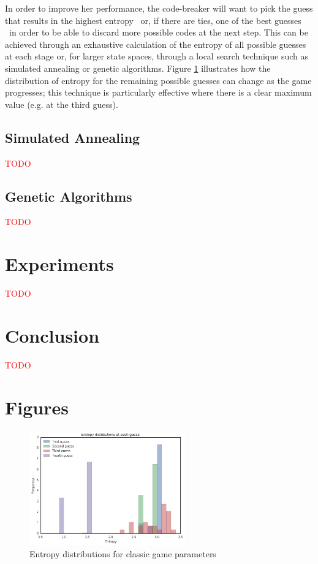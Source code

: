 \documentclass[11pt]{article}
\begin{document}
In order to improve her performance, the code-breaker will want to pick the guess that results in the highest entropy \textendash \ or, if there are ties, one of the best guesses \textendash \ in order to be able to discard more possible codes at the next step. This can be achieved through an exhaustive calculation of the entropy of all possible guesses at each stage or, for larger state spaces, through a local search technique such as simulated annealing or genetic algorithms.  Figure \ref{fig:entropy} illustrates how the distribution of entropy for the remaining possible guesses can change as the game progresses; this technique is particularly effective where there is a clear maximum value (e.g. at the third guess).

\subsection{Simulated Annealing}

\noindent \textcolor{red}{TODO}

\subsection{Genetic Algorithms}

\noindent \textcolor{red}{TODO}

\section{Experiments}

\noindent \textcolor{red}{TODO}

\section{Conclusion}

\noindent \textcolor{red}{TODO}


\newpage
\appendix

\section{Figures}

\begin{figure}[!htbp]
\centering
\includegraphics[width=0.6\textwidth]{img/entropy}
\caption{Entropy distributions for classic game parameters}
\label{fig:entropy}
\end{figure}
\end{document}
